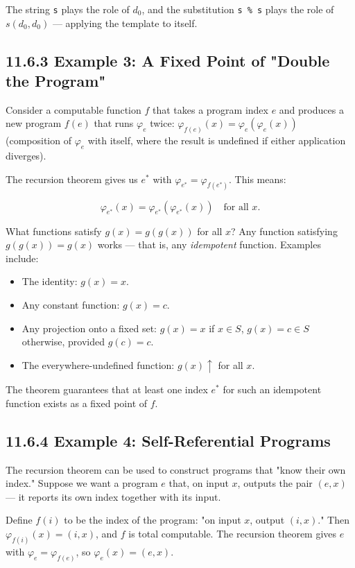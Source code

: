 The string \texttt{s} plays the role of $d_0$, and the substitution \texttt{s \% s} plays the role of $s(d_0, d_0)$ --- applying the template to itself.

\subsection{11.6.3 Example 3: A Fixed Point of "Double the Program"}

Consider a computable function $f$ that takes a program index $e$ and produces a new program $f(e)$ that runs $\varphi_e$ twice: $\varphi_{f(e)}(x) = \varphi_e(\varphi_e(x))$ (composition of $\varphi_e$ with itself, where the result is undefined if either application diverges).

The recursion theorem gives us $e^*$ with $\varphi_{e^*} = \varphi_{f(e^*)}$. This means:

\[
\varphi_{e^*}(x) = \varphi_{e^*}(\varphi_{e^*}(x)) \quad \text{for all } x.
\]

What functions satisfy $g(x) = g(g(x))$ for all $x$? Any function satisfying $g(g(x)) = g(x)$ works --- that is, any \textit{idempotent} function. Examples include:

\begin{itemize}
  \item The identity: $g(x) = x$.
  \item Any constant function: $g(x) = c$.
  \item Any projection onto a fixed set: $g(x) = x$ if $x \in S$, $g(x) = c \in S$ otherwise, provided $g(c) = c$.
  \item The everywhere-undefined function: $g(x)\!\uparrow$ for all $x$.
\end{itemize}

The theorem guarantees that at least one index $e^*$ for such an idempotent function exists as a fixed point of $f$.

\subsection{11.6.4 Example 4: Self-Referential Programs}

The recursion theorem can be used to construct programs that "know their own index." Suppose we want a program $e$ that, on input $x$, outputs the pair $(e, x)$ --- it reports its own index together with its input.

Define $f(i)$ to be the index of the program: "on input $x$, output $(i, x)$." Then $\varphi_{f(i)}(x) = (i, x)$, and $f$ is total computable. The recursion theorem gives $e$ with $\varphi_e = \varphi_{f(e)}$, so $\varphi_e(x) = (e, x)$.

